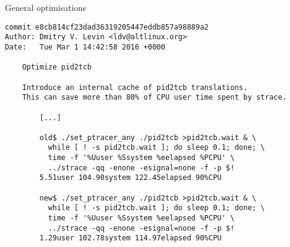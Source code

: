 \documentclass[unicode,aspectratio=169]{beamer}
\begin{document}
\begin{frame}[fragile]{General optimisations}
\begin{block}{}
\begin{scriptsize}
\begin{verbatim}
commit e8cb814cf23dad36319205447eddb857a98889a2
Author: Dmitry V. Levin <ldv@altlinux.org>
Date:   Tue Mar 1 14:42:58 2016 +0000

    Optimize pid2tcb
    
    Introduce an internal cache of pid2tcb translations.
    This can save more than 80% of CPU user time spent by strace.
    
        [...]
    
        old$ ./set_ptracer_any ./pid2tcb >pid2tcb.wait & \
          while [ ! -s pid2tcb.wait ]; do sleep 0.1; done; \
          time -f '%Uuser %Ssystem %eelapsed %PCPU' \
          ../strace -qq -enone -esignal=none -f -p $!
        5.51user 104.90system 122.45elapsed 90%CPU
    
        new$ ./set_ptracer_any ./pid2tcb >pid2tcb.wait & \
          while [ ! -s pid2tcb.wait ]; do sleep 0.1; done; \
          time -f '%Uuser %Ssystem %eelapsed %PCPU' \
          ../strace -qq -enone -esignal=none -f -p $!
        1.29user 102.78system 114.97elapsed 90%CPU
\end{verbatim}
\end{scriptsize}
\end{block}
\end{frame}
\end{document}
